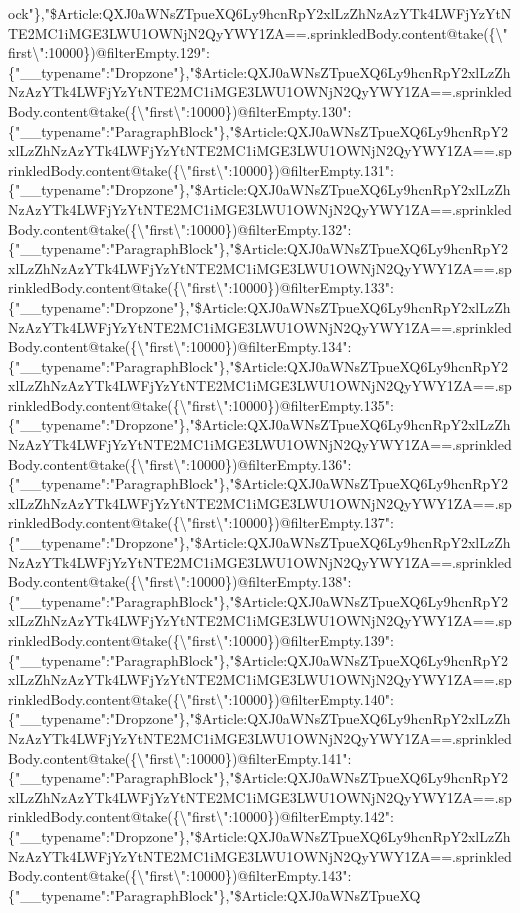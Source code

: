 ock"\},"\$Article:QXJ0aWNsZTpueXQ6Ly9hcnRpY2xlLzZhNzAzYTk4LWFjYzYtNTE2MC1iMGE3LWU1OWNjN2QyYWY1ZA==.sprinkledBody.content@take(\{\textbackslash{}"first\textbackslash{}":10000\})@filterEmpty.129":\{"\_\_typename":"Dropzone"\},"\$Article:QXJ0aWNsZTpueXQ6Ly9hcnRpY2xlLzZhNzAzYTk4LWFjYzYtNTE2MC1iMGE3LWU1OWNjN2QyYWY1ZA==.sprinkledBody.content@take(\{\textbackslash{}"first\textbackslash{}":10000\})@filterEmpty.130":\{"\_\_typename":"ParagraphBlock"\},"\$Article:QXJ0aWNsZTpueXQ6Ly9hcnRpY2xlLzZhNzAzYTk4LWFjYzYtNTE2MC1iMGE3LWU1OWNjN2QyYWY1ZA==.sprinkledBody.content@take(\{\textbackslash{}"first\textbackslash{}":10000\})@filterEmpty.131":\{"\_\_typename":"Dropzone"\},"\$Article:QXJ0aWNsZTpueXQ6Ly9hcnRpY2xlLzZhNzAzYTk4LWFjYzYtNTE2MC1iMGE3LWU1OWNjN2QyYWY1ZA==.sprinkledBody.content@take(\{\textbackslash{}"first\textbackslash{}":10000\})@filterEmpty.132":\{"\_\_typename":"ParagraphBlock"\},"\$Article:QXJ0aWNsZTpueXQ6Ly9hcnRpY2xlLzZhNzAzYTk4LWFjYzYtNTE2MC1iMGE3LWU1OWNjN2QyYWY1ZA==.sprinkledBody.content@take(\{\textbackslash{}"first\textbackslash{}":10000\})@filterEmpty.133":\{"\_\_typename":"Dropzone"\},"\$Article:QXJ0aWNsZTpueXQ6Ly9hcnRpY2xlLzZhNzAzYTk4LWFjYzYtNTE2MC1iMGE3LWU1OWNjN2QyYWY1ZA==.sprinkledBody.content@take(\{\textbackslash{}"first\textbackslash{}":10000\})@filterEmpty.134":\{"\_\_typename":"ParagraphBlock"\},"\$Article:QXJ0aWNsZTpueXQ6Ly9hcnRpY2xlLzZhNzAzYTk4LWFjYzYtNTE2MC1iMGE3LWU1OWNjN2QyYWY1ZA==.sprinkledBody.content@take(\{\textbackslash{}"first\textbackslash{}":10000\})@filterEmpty.135":\{"\_\_typename":"Dropzone"\},"\$Article:QXJ0aWNsZTpueXQ6Ly9hcnRpY2xlLzZhNzAzYTk4LWFjYzYtNTE2MC1iMGE3LWU1OWNjN2QyYWY1ZA==.sprinkledBody.content@take(\{\textbackslash{}"first\textbackslash{}":10000\})@filterEmpty.136":\{"\_\_typename":"ParagraphBlock"\},"\$Article:QXJ0aWNsZTpueXQ6Ly9hcnRpY2xlLzZhNzAzYTk4LWFjYzYtNTE2MC1iMGE3LWU1OWNjN2QyYWY1ZA==.sprinkledBody.content@take(\{\textbackslash{}"first\textbackslash{}":10000\})@filterEmpty.137":\{"\_\_typename":"Dropzone"\},"\$Article:QXJ0aWNsZTpueXQ6Ly9hcnRpY2xlLzZhNzAzYTk4LWFjYzYtNTE2MC1iMGE3LWU1OWNjN2QyYWY1ZA==.sprinkledBody.content@take(\{\textbackslash{}"first\textbackslash{}":10000\})@filterEmpty.138":\{"\_\_typename":"ParagraphBlock"\},"\$Article:QXJ0aWNsZTpueXQ6Ly9hcnRpY2xlLzZhNzAzYTk4LWFjYzYtNTE2MC1iMGE3LWU1OWNjN2QyYWY1ZA==.sprinkledBody.content@take(\{\textbackslash{}"first\textbackslash{}":10000\})@filterEmpty.139":\{"\_\_typename":"ParagraphBlock"\},"\$Article:QXJ0aWNsZTpueXQ6Ly9hcnRpY2xlLzZhNzAzYTk4LWFjYzYtNTE2MC1iMGE3LWU1OWNjN2QyYWY1ZA==.sprinkledBody.content@take(\{\textbackslash{}"first\textbackslash{}":10000\})@filterEmpty.140":\{"\_\_typename":"Dropzone"\},"\$Article:QXJ0aWNsZTpueXQ6Ly9hcnRpY2xlLzZhNzAzYTk4LWFjYzYtNTE2MC1iMGE3LWU1OWNjN2QyYWY1ZA==.sprinkledBody.content@take(\{\textbackslash{}"first\textbackslash{}":10000\})@filterEmpty.141":\{"\_\_typename":"ParagraphBlock"\},"\$Article:QXJ0aWNsZTpueXQ6Ly9hcnRpY2xlLzZhNzAzYTk4LWFjYzYtNTE2MC1iMGE3LWU1OWNjN2QyYWY1ZA==.sprinkledBody.content@take(\{\textbackslash{}"first\textbackslash{}":10000\})@filterEmpty.142":\{"\_\_typename":"Dropzone"\},"\$Article:QXJ0aWNsZTpueXQ6Ly9hcnRpY2xlLzZhNzAzYTk4LWFjYzYtNTE2MC1iMGE3LWU1OWNjN2QyYWY1ZA==.sprinkledBody.content@take(\{\textbackslash{}"first\textbackslash{}":10000\})@filterEmpty.143":\{"\_\_typename":"ParagraphBlock"\},"\$Article:QXJ0aWNsZTpueXQ